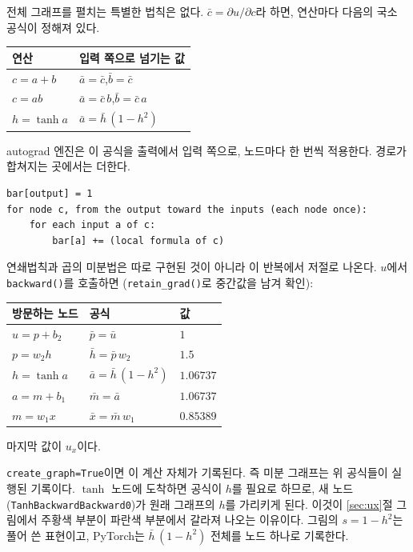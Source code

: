 \documentclass[11pt,a4paper]{article}
\begin{document}
전체 그래프를 펼치는 특별한 법칙은 없다. $\bar c=\partial u/\partial c$라 하면, 연산마다 다음의 국소 공식이 정해져 있다.
\begin{center}
\begin{tabular}{@{}ll@{}}
\toprule
연산 & 입력 쪽으로 넘기는 값 \\
\midrule
$c=a+b$ & $\bar a=\bar c$,\quad $\bar b=\bar c$ \\
$c=ab$ & $\bar a=\bar c\,b$,\quad $\bar b=\bar c\,a$ \\
$h=\tanh a$ & $\bar a=\bar h\,(1-h^2)$ \\
\bottomrule
\end{tabular}
\end{center}
autograd 엔진은 이 공식을 출력에서 입력 쪽으로, 노드마다 한 번씩 적용한다. 경로가 합쳐지는 곳에서는 더한다.
\begin{lstlisting}[language={},numbers=none]
bar[output] = 1
for node c, from the output toward the inputs (each node once):
    for each input a of c:
        bar[a] += (local formula of c)
\end{lstlisting}
연쇄법칙과 곱의 미분법은 따로 구현된 것이 아니라 이 반복에서 저절로 나온다.
$u$에서 \texttt{backward()}를 호출하면 (\texttt{retain\_grad()}로 중간값을 남겨 확인):
\begin{center}
\begin{tabular}{@{}lll@{}}
\toprule
방문하는 노드 & 공식 & 값 \\
\midrule
$u=p+b_2$ & $\bar p=\bar u$ & $1$ \\
$p=w_2h$ & $\bar h=\bar p\,w_2$ & $1.5$ \\
$h=\tanh a$ & $\bar a=\bar h\,(1-h^2)$ & $1.06737$ \\
$a=m+b_1$ & $\bar m=\bar a$ & $1.06737$ \\
$m=w_1x$ & $\bar x=\bar m\,w_1$ & $0.85389$ \\
\bottomrule
\end{tabular}
\end{center}
마지막 값이 $u_x$이다.

\texttt{create\_graph=True}이면 이 계산 자체가 기록된다. 즉 미분 그래프는 위 공식들이 실행된 기록이다.
$\tanh$ 노드에 도착하면 공식이 $h$를 필요로 하므로, 새 노드 (\texttt{TanhBackwardBackward0})가 원래 그래프의 $h$를 가리키게 된다.
이것이 \ref{sec:ux}절 그림에서 주황색 부분이 파란색 부분에서 갈라져 나오는 이유이다.
그림의 $s=1-h^2$는 풀어 쓴 표현이고, PyTorch는 $\bar h\,(1-h^2)$ 전체를 노드 하나로 기록한다.
\end{document}
